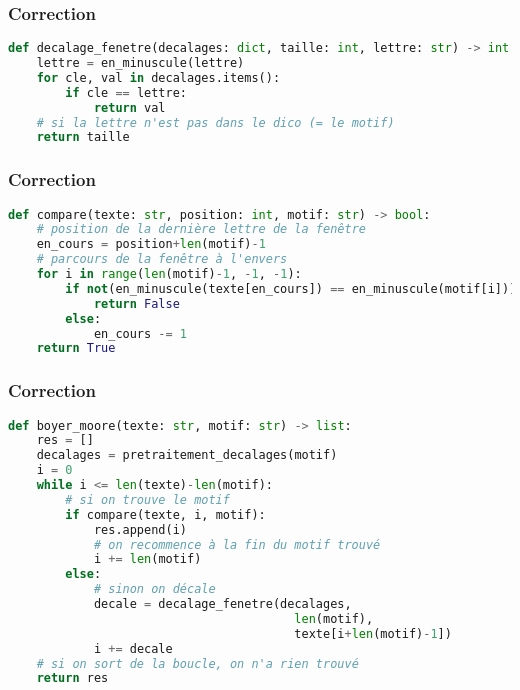 \documentclass[svgnames,11pt]{beamer}
\begin{document}
\begin{frame}[fragile]
    \frametitle{Correction}

    \begin{center}
    \begin{lstlisting}[language=Python , basicstyle=\small, xleftmargin=2em, xrightmargin=2em]
def decalage_fenetre(decalages: dict, taille: int, lettre: str) -> int:
    lettre = en_minuscule(lettre)
    for cle, val in decalages.items():
        if cle == lettre:
            return val
    # si la lettre n'est pas dans le dico (= le motif)
    return taille  
\end{lstlisting}
    \end{center}

\end{frame}
\begin{frame}[fragile]
    \frametitle{Correction}

    \begin{center}
    \begin{lstlisting}[language=Python , basicstyle=\small, xleftmargin=2em, xrightmargin=2em]
def compare(texte: str, position: int, motif: str) -> bool:
    # position de la dernière lettre de la fenêtre
    en_cours = position+len(motif)-1
    # parcours de la fenêtre à l'envers
    for i in range(len(motif)-1, -1, -1):
        if not(en_minuscule(texte[en_cours]) == en_minuscule(motif[i])):
            return False
        else:
            en_cours -= 1
    return True
\end{lstlisting}
    \end{center}

\end{frame}
\begin{frame}[fragile]
    \frametitle{Correction}

    \begin{center}
    \begin{lstlisting}[language=Python , basicstyle=\small, xleftmargin=2em, xrightmargin=2em]
def boyer_moore(texte: str, motif: str) -> list:
    res = []
    decalages = pretraitement_decalages(motif)
    i = 0
    while i <= len(texte)-len(motif):
        # si on trouve le motif
        if compare(texte, i, motif):
            res.append(i)
            # on recommence à la fin du motif trouvé
            i += len(motif)
        else:
            # sinon on décale
            decale = decalage_fenetre(decalages,
                                        len(motif),
                                        texte[i+len(motif)-1])
            i += decale
    # si on sort de la boucle, on n'a rien trouvé
    return res
\end{lstlisting}
    \end{center}

\end{frame}
\end{document}
